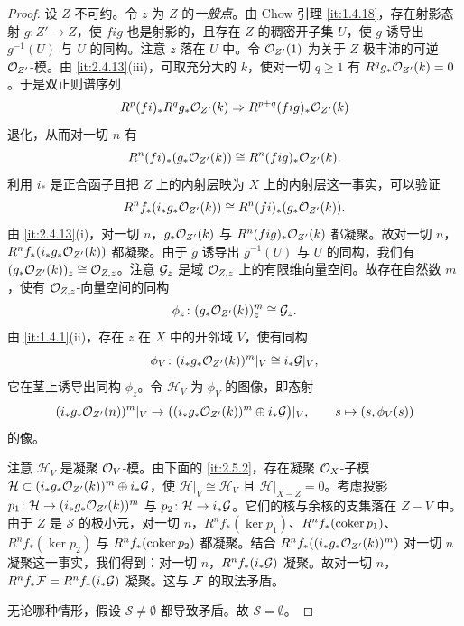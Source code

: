 \begin{proof}
设 $Z$ 不可约。令 $z$ 为 $Z$ 的\emph{一般点}。由 Chow 引理 \ref{it:1.4.18}，存在射影态射 $g\colon Z'\to Z$，使 $fig$ 也是射影的，且存在 $Z$ 的稠密开子集 $U$，使 $g$ 诱导出 $g^{-1}(U)$ 与 $U$ 的同构。注意 $z$ 落在 $U$ 中。令 $\mathcal{O}_{Z'}(1)$ 为关于 $Z$ 极丰沛的可逆 $\mathcal{O}_{Z'}$-模。由 \ref{it:2.4.13}(iii)，可取充分大的 $k$，使对一切 $q\ge 1$ 有 $R^qg_*\mathcal{O}_{Z'}(k)=0$。于是双正则谱序列
\[
R^p(fi)_*R^qg_*\mathcal{O}_{Z'}(k)\Rightarrow R^{p+q}(fig)_*\mathcal{O}_{Z'}(k)
\]
退化，从而对一切 $n$ 有
\[
R^n(fi)_*(g_*\mathcal{O}_{Z'}(k))\cong R^n(fig)_*\mathcal{O}_{Z'}(k).
\]
利用 $i_*$ 是正合函子且把 $Z$ 上的内射层映为 $X$ 上的内射层这一事实，可以验证
\[
R^nf_*(i_*g_*\mathcal{O}_{Z'}(k))\cong R^n(fi)_*(g_*\mathcal{O}_{Z'}(k)).
\]
由 \ref{it:2.4.13}(i)，对一切 $n$，$g_*\mathcal{O}_{Z'}(k)$ 与 $R^n(fig)_*\mathcal{O}_{Z'}(k)$ 都凝聚。故对一切 $n$，$R^nf_*(i_*g_*\mathcal{O}_{Z'}(k))$ 都凝聚。由于 $g$ 诱导出 $g^{-1}(U)$ 与 $U$ 的同构，我们有 $(g_*\mathcal{O}_{Z'}(k))_z\cong\mathcal{O}_{Z,z}$。注意 $\mathcal{G}_z$ 是域 $\mathcal{O}_{Z,z}$ 上的有限维向量空间。故存在自然数 $m$，使有 $\mathcal{O}_{Z,z}$-向量空间的同构
\[
\phi_z\colon (g_*\mathcal{O}_{Z'}(k))_z^m\cong\mathcal{G}_z.
\]
由 \ref{it:1.4.1}(ii)，存在 $z$ 在 $X$ 中的开邻域 $V$，使有同构
\[
\phi_V\colon (i_*g_*\mathcal{O}_{Z'}(k))^m|_V\cong i_*\mathcal{G}|_V,
\]
它在茎上诱导出同构 $\phi_z$。令 $\mathcal{H}_V$ 为 $\phi_V$ 的图像，即态射
\[
(i_*g_*\mathcal{O}_{Z'}(n))^m|_V\to\bigl((i_*g_*\mathcal{O}_{Z'}(k))^m\oplus i_*\mathcal{G}\bigr)|_V,\qquad s\mapsto(s,\phi_V(s))
\]
的像。

注意 $\mathcal{H}_V$ 是凝聚 $\mathcal{O}_V$-模。由下面的 \ref{it:2.5.2}，存在凝聚 $\mathcal{O}_X$-子模 $\mathcal{H}\subset (i_*g_*\mathcal{O}_{Z'}(k))^m\oplus i_*\mathcal{G}$，使 $\mathcal{H}|_V\cong\mathcal{H}_V$ 且 $\mathcal{H}|_{X-Z}=0$。考虑投影 $p_1\colon\mathcal{H}\to(i_*g_*\mathcal{O}_{Z'}(k))^m$ 与 $p_2\colon\mathcal{H}\to i_*\mathcal{G}$。它们的核与余核的支集落在 $Z-V$ 中。由于 $Z$ 是 $\mathcal{S}$ 的极小元，对一切 $n$，$R^nf_*(\ker p_1)$、$R^nf_*(\operatorname{coker} p_1)$、$R^nf_*(\ker p_2)$ 与 $R^nf_*(\operatorname{coker} p_2)$ 都凝聚。结合 $R^nf_*((i_*g_*\mathcal{O}_{Z'}(k))^m)$ 对一切 $n$ 凝聚这一事实，我们得到：对一切 $n$，$R^nf_*(i_*\mathcal{G})$ 凝聚。故对一切 $n$，$R^nf_*\mathcal{F}=R^nf_*(i_*\mathcal{G})$ 凝聚。这与 $\mathcal{F}$ 的取法矛盾。

无论哪种情形，假设 $\mathcal{S}\neq\emptyset$ 都导致矛盾。故 $\mathcal{S}=\emptyset$。
\end{proof}

